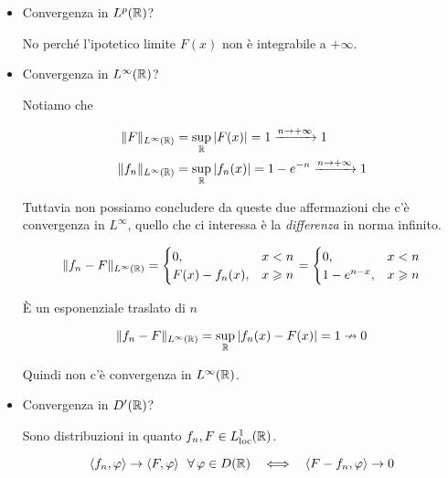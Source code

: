 \begin{itemize}
\item Convergenza in $L^{p}(\mathbb{R})$?

No perché l'ipotetico limite $F(x)$ non è integrabile a $ + \infty $.
\item Convergenza in $L^{\infty }(\mathbb{R})$?

Notiamo che

\begin{equation*}
\begin{aligned}
\Vert F\Vert _{L^{\infty }(\mathbb{R})} & = \sup _{\mathbb{R} }| F(x)| = 1\xrightarrow{n\rightarrow + \infty } 1\\
\Vert f_{n}\Vert _{L^{\infty }(\mathbb{R})} & = \sup _{\mathbb{R} }| f_{n}(x)| = 1 - e^{ - n}\xrightarrow{n\rightarrow + \infty } 1
\end{aligned}
\end{equation*}

Tuttavia non possiamo concludere da queste due affermazioni che c'è convergenza in $L^{\infty }$, quello che ci interessa è la \textit{differenza} in norma infinito.

\begin{equation*}
\Vert f_{n} - F\Vert _{L^{\infty }(\mathbb{R})} = \begin{cases}
0, & x < n\\
F(x) - f_{n}(x) , & x\geqslant n
\end{cases} = \begin{cases}
0, & x < n\\
1 - e^{n - x} , & x\geqslant n
\end{cases}
\end{equation*}

È un esponenziale traslato di $n$

\begin{equation*}
\Vert f_{n} - F\Vert _{L^{\infty }(\mathbb{R})} = \sup _{\mathbb{R} }| f_{n}(x) - F(x)| = 1\nrightarrow 0
\end{equation*}

Quindi non c'è convergenza in $L^{\infty }(\mathbb{R})$.
\item Convergenza in $D'(\mathbb{R})$?

Sono distribuzioni in quanto $f_{n} ,F\in L^{1}_{\operatorname{loc}}(\mathbb{R})$.

\begin{equation*}
\langle f_{n} ,\varphi \rangle \rightarrow \langle F,\varphi \rangle \ \ \forall \varphi \in D(\RR) \ \ \iff \ \ \langle F - f_{n} ,\varphi \rangle \rightarrow 0
\end{equation*}


\end{itemize}
